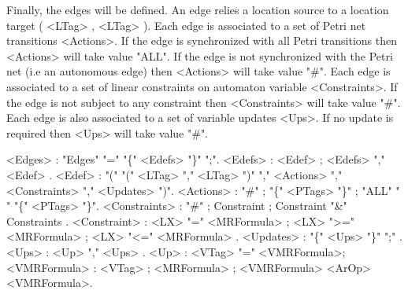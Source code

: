\documentclass[a4paper]{article}
\begin{document}
Finally, the edges will be defined. An edge relies a location source to a location target ( <LTag> , <LTag> ). 
Each edge is associated to a set of Petri net transitions <Actions>. If the edge is synchronized with all Petri transitions then
<Actions> will take value "ALL". If the edge is not synchronized with the Petri net (i.e an autonomous edge) then <Actions> will take 
value "\#". Each edge is associated to a set of linear constraints on automaton variable <Constraints>. If the edge is not subject  to any 
constraint then <Constraints> will take value "\#". Each edge is also associated to a set of variable updates <Ups>. If no update is required then 
<Ups> will take value "\#". 
\begin{grammar}
[(colon){$::=$ }]
[(semicolon){$|$ }]
[(period){\\ }]
[(quote){"}{" }]
[(nonterminal){$\langle$}{$\rangle$ }]
<Edges> : "Edges" "=" "\{" <Edefs> "\}" ";".
<Edefs> : <Edef> ; <Edefs> "," <Edef> .
<Edef> : "(" "(" <LTag> "," <LTag> ")" "," <Actions> "," <Constraints> "," <Updates> ")".
<Actions> : "\#" ; "\{" <PTags> "\}" ; "ALL" "\\" "\{" <PTags> "\}".
<Constraints> : "\#" ; Constraint ; Constraint "\&" Constraints .
<Constraint> : <LX> "=" <MRFormula> ; <LX> ">=" <MRFormula> ; <LX> "<=" <MRFormula> .
<Updates> : "\{" <Ups> "\}" ";" .
<Ups> : <Up> "," <Ups> .
<Up> : <VTag> "=" <VMRFormula>;
<VMRFormula> : <VTag> ; <MRFormula> ; <VMRFormula> <ArOp> <VMRFormula>.
\end{grammar}
\end{document}
